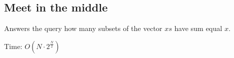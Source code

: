 \subsection{Meet in the middle}

Answers the query how many subsets of the vector $xs$ have sum equal $x$.

Time: $O(N \cdot 2^{\frac{N}{2}})$
